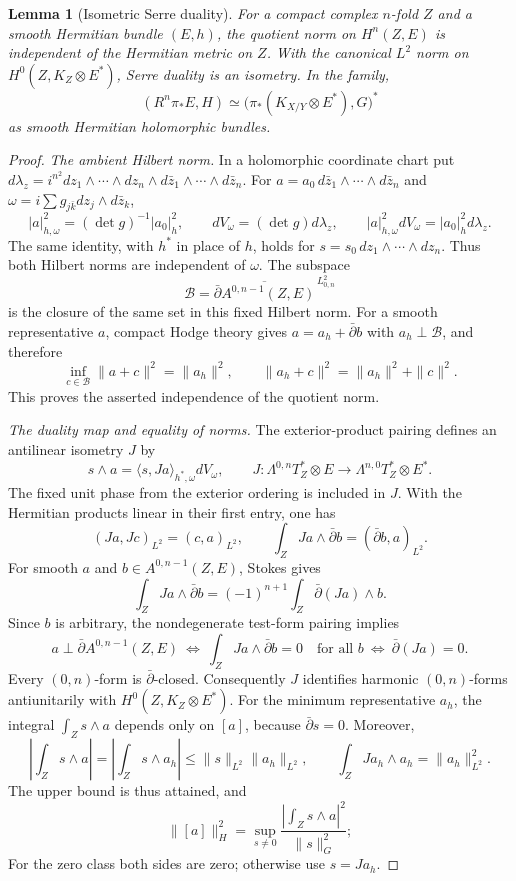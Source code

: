 \documentclass[11pt,reqno]{amsart}
\numberwithin{equation}{section}
\newtheorem{lemma}[theorem]{Lemma}
\theoremstyle{definition}
\theoremstyle{remark}
\begin{document}
\begin{lemma}[Isometric Serre duality]\label{lem:serre-isometry}
For a compact complex $n$-fold $Z$ and a smooth Hermitian bundle
$(E,h)$, the quotient norm on $H^n(Z,E)$ is independent of the
Hermitian metric on $Z$.  With the canonical $L^2$ norm on
$H^0(Z,K_Z\otimes E^*)$, Serre duality is an isometry.  In the family,
\begin{equation}\label{eq:serre-isometry}
 (R^n\pi_*E,H)
 \simeq\bigl(\pi_*(K_{X/Y}\otimes E^*),G\bigr)^*
\end{equation}
as smooth Hermitian holomorphic bundles.
\end{lemma}
\begin{proof}
\emph{The ambient Hilbert norm.}
In a holomorphic coordinate chart put
$d\lambda_z=i^{n^2}dz_1\wedge\cdots\wedge dz_n
\wedge d\bar z_1\wedge\cdots\wedge d\bar z_n$.
For $a=a_0\,d\bar z_1\wedge\cdots\wedge d\bar z_n$ and
$\omega=i\sum g_{j\bar k}dz_j\wedge d\bar z_k$,
\[
 |a|_{h,\omega}^2=(\det g)^{-1}|a_0|_h^2,
 \qquad dV_\omega=(\det g)d\lambda_z,
 \qquad |a|_{h,\omega}^2dV_\omega=|a_0|_h^2d\lambda_z.
\]
The same identity, with $h^*$ in place of $h$, holds for
$s=s_0\,dz_1\wedge\cdots\wedge dz_n$.
Thus both Hilbert norms are independent of $\omega$.
The subspace
\[
 \mathcal B=\overline{\bar\partial A^{0,n-1}(Z,E)}^{\,L^2_{0,n}}
\]
is the closure of the same set in this fixed Hilbert norm.
For a smooth representative $a$, compact Hodge theory gives
$a=a_h+\bar\partial b$ with $a_h\perp\mathcal B$, and therefore
\[
 \inf_{c\in\mathcal B}\|a+c\|^2=\|a_h\|^2,
 \qquad \|a_h+c\|^2=\|a_h\|^2+\|c\|^2.
\]
This proves the asserted independence of the quotient norm.

\emph{The duality map and equality of norms.}
The exterior-product pairing defines an antilinear isometry $J$ by
\[
 s\wedge a=\langle s,Ja\rangle_{h^*,\omega}dV_\omega,
 \qquad
 J:\Lambda^{0,n}T_Z^*\otimes E\longrightarrow
       \Lambda^{n,0}T_Z^*\otimes E^*.
\]
The fixed unit phase from the exterior ordering is included in $J$.
With the Hermitian products linear in their first entry, one has
\[
 (Ja,Jc)_{L^2}=(c,a)_{L^2},\qquad
 \int_ZJa\wedge\bar\partial b=(\bar\partial b,a)_{L^2}.
\]
For smooth $a$ and $b\in A^{0,n-1}(Z,E)$, Stokes gives
\[
 \int_ZJa\wedge\bar\partial b
 =(-1)^{n+1}\int_Z\bar\partial(Ja)\wedge b.
\]
Since $b$ is arbitrary, the nondegenerate test-form pairing implies
\[
 a\perp\bar\partial A^{0,n-1}(Z,E)
 \ \Longleftrightarrow\
 \int_Z Ja\wedge\bar\partial b=0\quad\text{for all }b
 \ \Longleftrightarrow\ \bar\partial(Ja)=0.
\]
Every $(0,n)$-form is $\bar\partial$-closed.  Consequently $J$
identifies harmonic $(0,n)$-forms antiunitarily with
$H^0(Z,K_Z\otimes E^*)$.  For the minimum representative $a_h$,
the integral $\int_Zs\wedge a$ depends only on $[a]$, because
$\bar\partial s=0$.  Moreover,
\[
 \left|\int_Zs\wedge a\right|
 =\left|\int_Zs\wedge a_h\right|
 \le\|s\|_{L^2}\|a_h\|_{L^2},\qquad
 \int_ZJa_h\wedge a_h=\|a_h\|_{L^2}^2.
\]
The upper bound is thus attained, and
\begin{equation}\label{eq:serre-norm-sup}
 \|[a]\|_H^2
 =\sup_{s\ne0}
   \frac{|\int_Zs\wedge a|^2}{\|s\|_G^2};
\end{equation}
For the zero class both sides are zero; otherwise use $s=Ja_h$.


\end{proof}
\end{document}
